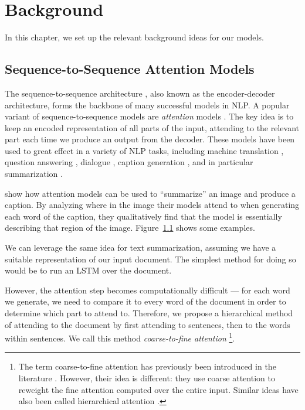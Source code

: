 \documentclass[11pt]{report}
\begin{document}
\chapter{Background}

In this chapter, we set up the relevant background ideas for our models.

\section{Sequence-to-Sequence Attention Models}

The sequence-to-sequence architecture \citep{sutskever2014sequence}, also known as the encoder-decoder architecture, forms the backbone of many successful models in NLP. A popular variant of sequence-to-sequence models are \emph{attention} models \citep{bahdanau2014neural}. The key idea is to keep an encoded representation of all parts of the input, attending to the relevant part each time we produce an output from the decoder.
These models have been used to great effect in a variety of NLP tasks, including machine translation \citep{sutskever2014sequence, bahdanau2014neural}, question answering \citep{Hermann2015}, dialogue \citep{li2016persona}, caption generation \citep{xu2015captioning}, and in particular summarization \citep{rush2015neural}.

\citet{xu2015captioning} show how attention models can be used to ``summarize'' an image and produce a caption. 
By analyzing where in the image their models attend to when generating each word of the caption, they qualitatively find that the model is essentially describing that region of the image. 
Figure~\ref{} shows some examples.


We can leverage the same idea for text summarization, assuming we have a suitable representation of our input document. The simplest method for doing so would be to run an LSTM over the document.

However, the attention step becomes computationally difficult --- for each word we generate, we need to compare it to every word of the document in order to determine which part to attend to. Therefore, we propose a hierarchical method of attending to the document by first attending to sentences, then to the words within sentences. We call this method \emph{coarse-to-fine attention}
\footnote{The term coarse-to-fine attention has previously been introduced in the literature \citep{mei2016}. However, their idea is different: they use coarse attention to reweight the fine attention computed over the entire input. Similar ideas have also been called hierarchical attention \citep{nallapati2016seq2seq}.}.
\end{document}
